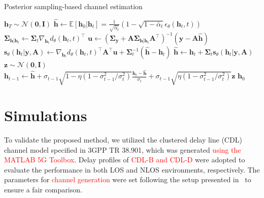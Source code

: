 \documentclass[lettersize,journal]{IEEEtran}
\newcommand{\tred}{\textcolor{red}}
\begin{document}
\begin{algorithm}[!t]
\caption{Posterior sampling-based channel estimation}
\label{alg:algorithm1}
\begin{algorithmic}[1]
\STATE $\mathbf{h}_T \sim \mathcal{N}(\mathbf{0}, \mathbf{I})$
	\STATE $\hat{\mathbf{h}} \gets \mathbb{E}[\mathbf{h}_{0}|\mathbf{h}_{t}] = \frac{1}{\sqrt{ \bar{\alpha}_{t} }}(1-\sqrt{ 1-\bar{\alpha}_{t} }\epsilon_{\theta}(\mathbf{h}_{t},t))$
	\STATE $\boldsymbol{\Sigma}_{\mathbf{h}|\mathbf{h}_{t}} \gets \boldsymbol{\Sigma}_{t} \nabla_{\mathbf{h}_{t}}d_{\theta}(\mathbf{h}_{t},t)^{\top}$
	\STATE $\mathbf{u} \gets (\boldsymbol{\Sigma}_{\mathbf{y}}+\mathbf{A}\boldsymbol{\Sigma}_{\mathbf{h}|\mathbf{h}_{t}}\mathbf{A}^{\top})^{-1}(\mathbf{y}-\mathbf{A}\hat{\mathbf{h}})$
	\STATE $\mathbf{s}_{\theta}(\mathbf{h}_{t}|\mathbf{y},\mathbf{A}) \gets \nabla_{\mathbf{h}_{t}}d_{\theta}(\mathbf{h}_{t},t)^{\top}\mathbf{A}^{\top}\mathbf{u} + \boldsymbol{\Sigma}_{t}^{-1}(\hat{\mathbf{h}}-\mathbf{h}_{t})$
	\STATE $\hat{\mathbf{h}} \gets \mathbf{h}_{t} + \boldsymbol{\Sigma}_{t}\mathbf{s}_{\theta}(\mathbf{h}_{t}|\mathbf{y},\mathbf{A})$
	\STATE $\mathbf{z}\sim\mathcal{N}(\mathbf{0},\mathbf{I})$
	\STATE $\mathbf{h}_{t-1} \gets \hat{\mathbf{h}} + \sigma_{t-1}\sqrt{ 1-\eta( 1- \sigma_{t-1}^{2} /\sigma_{t}^{2} ) }\frac{\mathbf{h}_{t}-\hat{\mathbf{h}}}{\sigma_{t}} + \sigma_{t-1}\sqrt{ \eta( 1- \sigma_{t-1}^{2} / \sigma_{t}^{2}) }\mathbf{z}$
\ENDFOR
\RETURN $\mathbf{h}_{0}$
\end{algorithmic}
\end{algorithm}

\section{Simulations}

To validate the proposed method, we utilized the clustered delay line (CDL)
channel model specified in 3GPP TR 38.901, which was generated \tred{using the MATLAB 5G Toolbox}. Delay profiles of \tred{CDL-B and CDL-D} were adopted to evaluate the performance in both LOS and NLOS environments, respectively. The parameters for \tred{channel generation} were set following the setup presented in~\cite{arvinteMIMOChannelEstimation2023} to ensure a fair comparison.
\end{document}
